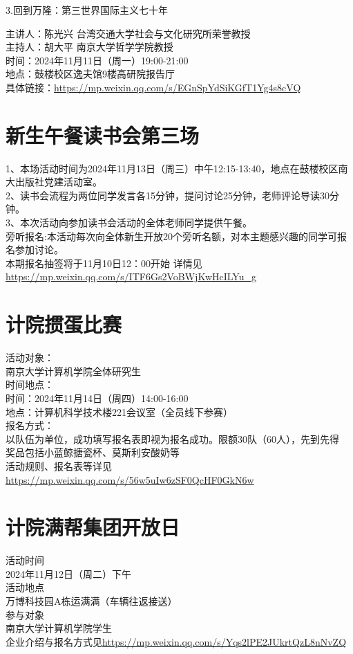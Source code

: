 \documentclass[letterpaper, 12pt]{article}
\begin{document}
\begin{multicols}{2}
3.回到万隆：第三世界国际主义七十年

主讲人：陈光兴 台湾交通大学社会与文化研究所荣誉教授\\
主持人：胡大平 南京大学哲学学院教授\\
时间：2024年11月11日（周一）19:00-21:00\\
地点：鼓楼校区逸夫馆9楼高研院报告厅\\
具体链接：\url{https://mp.weixin.qq.com/s/EGnSpYdSiKGfT1Yg4s8cVQ}\\


\section{新生午餐读书会第三场}
1、本场活动时间为2024年11月13日（周三）中午12:15-13:40，地点在鼓楼校区南大出版社党建活动室。\\
2、读书会流程为两位同学发言各15分钟，提问讨论25分钟，老师评论导读30分钟。\\
3、本次活动向参加读书会活动的全体老师同学提供午餐。\\
旁听报名:本活动每次向全体新生开放20个旁听名额，对本主题感兴趣的同学可报名参加讨论。\\
本期报名抽签将于11月10日12：00开始
详情见\url{https://mp.weixin.qq.com/s/ITF6Gs2VoBWjKwHcILYu_g}
\section{计院掼蛋比赛}
活动对象：\\
南京大学计算机学院全体研究生\\
时间地点：\\
时间：2024年11月14日（周四）14:00-16:00\\
地点：计算机科学技术楼221会议室（全员线下参赛）\\
报名方式：\\
以队伍为单位，成功填写报名表即视为报名成功。限额30队（60人），先到先得\\
奖品包括小蓝鲸搪瓷杯、莫斯利安酸奶等\\
活动规则、报名表等详见\url{https://mp.weixin.qq.com/s/56w5uIw6zSF0QcHF0GkN6w}\\
\section{计院满帮集团开放日}
活动时间\\
2024年11月12日（周二）下午\\
活动地点\\
万博科技园A栋运满满（车辆往返接送）\\
参与对象\\
南京大学计算机学院学生\\
企业介绍与报名方式见\url{https://mp.weixin.qq.com/s/Yqs2lPE2JUkrtQzL8nNvZQ}\\

\end{multicols}
\end{document}
